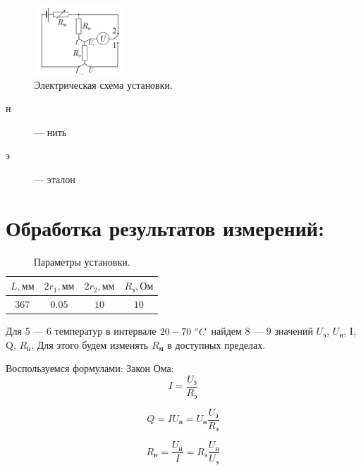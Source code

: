 \documentclass[a4paper,12pt]{article}
\begin{document}
\begin{figure}[H]
  \centering
  \includegraphics[width=0.3\textwidth]{data/circuit_fig.png}
  \caption{Электрическая схема установки.} \label{fig:circuit}
\end{figure}

\begin{description}
  \item[н] --- нить
  \item[э] --- эталон
\end{description}

\section{Обработка результатов измерений:}

\begin{table}[H]
  \begin{center}
    \begin{tabular}{|c|c|c|c|}
      \hline
      $L, \text{мм}$ & $2r_1, \text{мм}$ & $2r_2, \text{мм}$ & $R_{\text{э}}, \text{Ом}$ \\
      \hline
      $367$          & $0.05$            & $10$              & $10$                      \\
      \hline
    \end{tabular}
  \end{center}
  \caption{Параметры установки.\label{table:setup_pars}}
\end{table}

Для 5 --- 6 температур в интервале $20 - 70\ \Celsius$ найдем 8 --- 9 значений
$U_\text{э}$, $U_{\text{н}}$, I, Q, $R_{\text{н}}$.
Для этого будем изменять $R_{\text{м}}$ в доступных пределах.

Воспользуемся формулами:
Закон Ома:
\begin{equation}
  I = \frac{U_{\text{э}}}{R_\text{э}}
\end{equation}

\begin{equation}
  Q = I U_{\text{н}} = U_{\text{н}} \frac{U_{\text{э}}}{R_{\text{э}}}
\end{equation}

\begin{equation}
  R_\text{н} = \frac{U_\text{н}}{I} =R_\text{э} \frac{U_\text{н}}{U_\text{э}}
\end{equation}
\end{document}
